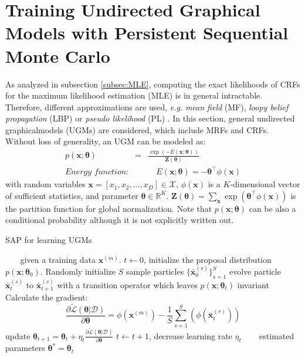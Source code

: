 \section{Training Undirected Graphical Models with Persistent Sequential Monte Carlo}
\label{sec:PSMC}
As analyzed in subsection \ref{subsec:MLE}, computing the exact likelihoods of CRFs for the maximum likelihood estimation (MLE) is in general intractable. 
Therefore, different approximations are used, \emph{e.g.} \emph{mean field} (MF), \emph{loopy 
belief propagation} (LBP) or \emph{pseudo likelihood} (PL) \citep{LBP, Kumar03,CRF,Accelerated_CRF}.  
In this section, general undirected graphicalmodels (UGMs) are considered, which include 
MRFs and CRFs. 
Without loss of generality, an UGM can be modeled as: 
\begin{eqnarray}
    p(\mathbf{x};\boldsymbol{\theta})&=&\frac{\exp\left(-E(\mathbf{x};\boldsymbol{\theta})\right)}{\mathbf{Z}(\boldsymbol{\theta})}
    \label{equ:MRF}\\
    \textit{Energy function:} & &\quad E(\mathbf{x};\boldsymbol{\theta})=-\boldsymbol{\theta}^\top \phi(\mathbf{x})
    \label{equ:energy}
\end{eqnarray}
with random variables $\mathbf{x}=[x_1,x_2,\dots,x_D]\in\mathcal{X}$, $\phi(\mathbf{x})$ is a $K$-dimensional vector of sufficient statistics, and parameter 
$\boldsymbol{\theta}\in \mathbb{R}^K$. $\mathbf{Z}(\boldsymbol{\theta})=\sum_{\mathbf{x}} \exp (\boldsymbol{\theta}^\top\phi(\mathbf{x}))$ is the partition function for global normalization. 
Note that $p(\mathbf{x};\boldsymbol{\theta})$ can be also a conditional probability although it is not explicitly written out. 
\begin{algorithm} [!t]                    
\caption{SAP for learning UGMs}          
\label{alg:SAP}                           
\begin{algorithmic}[1]
\REQUIRE ~~\ %
given a training data $\mathbf{x}^{(m)}$.  
\STATE  $t\gets 0$, initialize the proposal distribution $p(\mathbf{x};\boldsymbol{\theta}_0)$. 
\STATE  Randomly initialize $S$ sample particles $\{\bar{\mathbf{x}}_0^{(s)}\}_{s=1}^S$
\STATE evolve particle $\bar{\mathbf{x}}_t^{(s)}$ to $\bar{\mathbf{x}}_{t+1}^{(s)}$ with a transition operator which leaves $p(\mathbf{x};\boldsymbol{\theta}_t)$ invariant
\ENDFOR
\STATE Calculate the gradient:
\begin{equation*}
	\frac{\partial \tilde{\mathcal{L}}(\boldsymbol{\theta}|\mathcal{D})}{\partial \boldsymbol{\theta} }=\phi(\mathbf{x}^{(m)})-\frac{1}{S}\sum_{s=1}^S(\phi(\bar{\mathbf{x}}_t^{(s)}))
\end{equation*}
\STATE update $\boldsymbol{\theta}_{t+1}=\boldsymbol{\theta}_{t}+\eta_t \frac{\partial \tilde{\mathcal{L}}(\boldsymbol{\theta}|\mathcal{D})}{\partial \boldsymbol{\theta} }$
\STATE $t \gets t+1$, decrease learning rate $\eta_t$
\ENDWHILE
\ENSURE ~~\ %
estimated parameters  $\boldsymbol{\theta}^*=\boldsymbol{\theta}_t$  
\end{algorithmic}
\end{algorithm}



